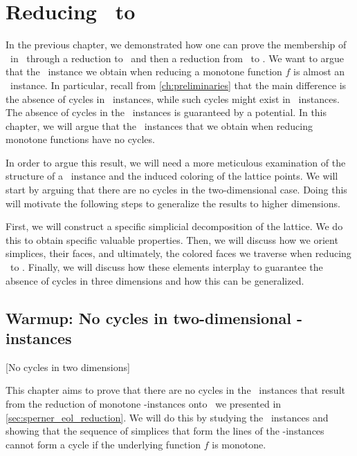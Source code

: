 \setchapterpreamble[u]{\margintoc}
\chapter{Reducing \Tarski\ to \EOPL}\label{ch:eopl_reduction}

In the previous chapter, we demonstrated how one can prove the membership of \Tarski\ in \PPAD\ through a reduction to \Sperner\ and then a reduction from \Sperner\ to \EndOfLine. We want to argue that the \EndOfLine\ instance we obtain when reducing a monotone function $f$ is almost an \EndOfPotentialLine\ instance. In particular, recall from \cref{ch:preliminaries} that the main difference is the absence of cycles in \EndOfPotentialLine\ instances, while such cycles might exist in \EndOfLine\ instances. The absence of cycles in the \EndOfPotentialLine\ instances is guaranteed by a potential. In this chapter, we will argue that the \EndOfLine\ instances that we obtain when reducing monotone functions have no cycles.

In order to argue this result, we will need a more meticulous examination of the structure of a \Tarski\ instance and the induced coloring of the lattice points. We will start by arguing that there are no cycles in the two-dimensional case. Doing this will motivate the following steps to generalize the results to higher dimensions.

First, we will construct a specific simplicial decomposition of the lattice. We do this to obtain specific valuable properties. Then, we will discuss how we orient simplices, their faces, and ultimately, the colored faces we traverse when reducing \Sperner\ to \EndOfLine. Finally, we will discuss how these elements interplay to guarantee the absence of cycles in three dimensions and how this can be generalized.

\section{Warmup: No cycles in two-dimensional \Tarskistar-instances}[No cycles in two dimensions]

This chapter aims to prove that there are no cycles in the \EndOfLine\ instances that result from the reduction of monotone \Tarskistar-instances onto \EndOfLine\ we presented in \cref{sec:sperner_eol_reduction}. We will do this by studying the \Sperner\ instances and showing that the sequence of simplices that form the lines of the \EndOfLine-instances cannot form a cycle if the underlying function $f$ is monotone.

